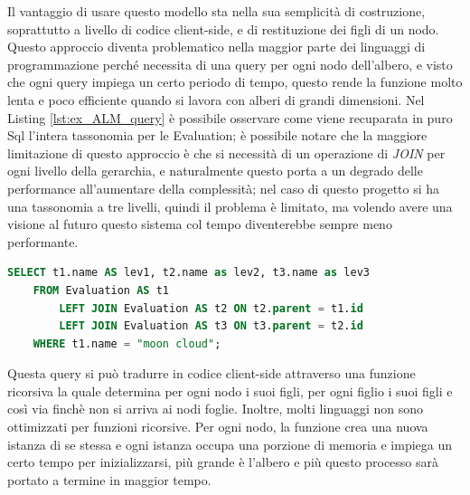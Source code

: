 \hfill\break
Il vantaggio di usare questo modello sta nella sua semplicità di costruzione, soprattutto a livello di codice client-side, 
e di restituzione dei figli di un nodo. Questo approccio diventa problematico nella maggior parte dei linguaggi 
di programmazione perché necessita di una query per ogni nodo dell'albero, e visto che ogni query impiega un certo periodo di tempo, 
questo rende la funzione molto lenta e poco efficiente quando si lavora con alberi di grandi dimensioni.\hfill\break
Nel Listing \ref{lst:ex_ALM_query} è possibile osservare come viene recuparata in puro Sql l'intera tassonomia per le Evaluation; 
è possibile notare che la maggiore limitazione di questo approccio è che si necessità di un operazione di \textit{JOIN} per ogni livello 
della gerarchia, e naturalmente questo porta a un degrado delle performance all'aumentare della complessità; nel caso di questo progetto
si ha una tassonomia a tre livelli, quindi il problema è limitato, ma volendo avere una visione al futuro questo sistema col tempo diventerebbe 
sempre meno performante.
\begin{lstlisting}[language=SQL, label=lst:ex_ALM_query, caption={Query in puro Sql per recuperare l'intera tassonomia delle Evaluation, 
    secondo l'Adjacency List Model.}]
SELECT t1.name AS lev1, t2.name as lev2, t3.name as lev3
    FROM Evaluation AS t1
        LEFT JOIN Evaluation AS t2 ON t2.parent = t1.id
        LEFT JOIN Evaluation AS t3 ON t3.parent = t2.id
    WHERE t1.name = "moon cloud";
\end{lstlisting}
Questa query si può tradurre in codice client-side attraverso una funzione ricorsiva la quale determina per ogni nodo i suoi figli, per ogni figlio
i suoi figli e così via finchè non si arriva ai nodi foglie. Inoltre, molti linguaggi non sono ottimizzati per funzioni ricorsive. 
Per ogni nodo, la funzione crea una nuova istanza di se stessa e ogni istanza occupa una porzione di memoria e impiega un certo 
tempo per inizializzarsi, più grande è l'albero e più questo processo sarà portato a termine in maggior tempo.
%
